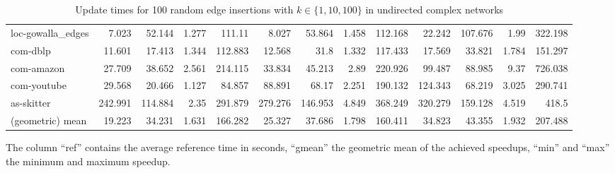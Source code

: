 \begin{landscape}
\begin{table}[h]
\begin{tabular}{l|rrrr|rrrr|rrrr}
 loc-gowalla\_edges    &   7.023 &  52.144 & 1.277 & 111.11  &   8.027 &  53.864 & 1.458 & 112.168 &  22.242 & 107.676 & 1.99  & 322.198 \\
 com-dblp     &  11.601 &  17.413 & 1.344 & 112.883 &  12.568 &  31.8   & 1.332 & 117.433 &  17.569 &  33.821 & 1.784 & 151.297 \\
 com-amazon   &  27.709 &  38.652 & 2.561 & 214.115 &  33.834 &  45.213 & 2.89  & 220.926 &  99.487 &  88.985 & 9.37  & 726.038 \\
 com-youtube  &  29.568 &  20.466 & 1.127 &  84.857 &  88.891 &  68.17  & 2.251 & 190.132 & 124.343 &  68.219 & 3.025 & 290.741 \\
 as-skitter           & 242.991 & 114.884 & 2.35  & 291.879 & 279.276 & 146.953 & 4.849 & 368.249 & 320.279 & 159.128 & 4.519 & 418.5   \\ \midrule \midrule
 (geometric) mean     &  19.223 &  34.231 & 1.631 & 166.282 &  25.327 &  37.686 & 1.798 & 160.411 &  34.823 &  43.355 & 1.932 & 207.488 \\
\bottomrule
\end{tabular}

\caption{Update times for 100 random edge insertions with  $k \in \{1, 10, 100\}$ in undirected complex networks}{The column ``ref'' contains the average reference time in seconds, ``gmean'' the geometric mean of the achieved speedups, ``min'' and ``max'' the minimum and maximum speedup.}
\label{tbl:topkUndirectedComplex}
\end{table}
\end{landscape}


